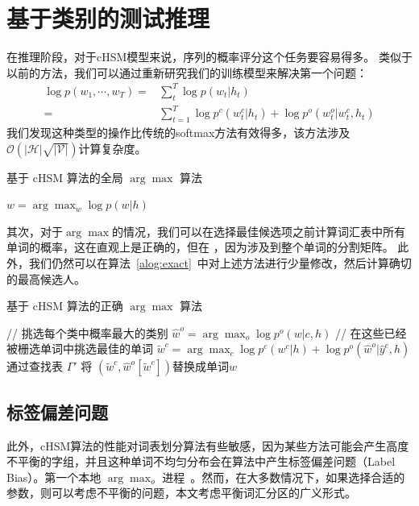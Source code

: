 \section{基于类别的测试推理}
在推理阶段，对于cHSM模型来说，序列的概率评分这个任务要容易得多。
类似于以前的方法，我们可以通过重新研究我们的训练模型来解决第一个问题：
\begin{equation}\label{equ:class_inf}
\begin{split}
\log p(w_1,\cdots, w_T)=&\sum_t^T\log p(w_t|h_t) \\
=&\sum_{t=1}^{T}\log p^c(w^c_t|h_t) +\log p^o(w^o_t|w^c_t,h_t)
\end{split}
\end{equation}
我们发现这种类型的操作比传统的softmax方法有效得多，该方法涉及$ \mathcal{O(|H|\sqrt{|\mathcal{V}|})}$计算复杂度。

\begin{algorithm}[!ht]
\caption{基于 cHSM 算法的全局 $\arg\max$ 算法}\label{alog:alls}
 {$w=\arg\max_w \log p(w|h)$}\;
\end{algorithm}

其次，对于$\arg\max $的情况，我们可以在选择最佳候选项之前计算词汇表中所有单词的概率，这在直观上是正确的，但在
，因为涉及到整个单词的分割矩阵。 此外，我们仍然可以在算法~\ref{alog:exact}~中对上述方法进行少量修改，然后计算确切的最高候选人。
\begin{algorithm}[!ht]
\caption{基于 cHSM 算法的正确 $\arg\max$ 算法}\label{alog:exact}
{// 挑选每个类中概率最大的类别}\;
 {$\hat w^o=\arg\max_o{\log p^o(w| c,h)}$ }\;
 {// 在这些已经被栅选单词中挑选最佳的单词}
 {$\tilde w^c=\arg\max_c{\log p^c(w^c|h)+\log p^o(\hat w^o|\hat y^c,h)}$}\;
通过查找表 $\Gamma'$ 将 $(\tilde w^c,\hat w^o[\tilde w^c])$替换成单词$w$ \;
\end{algorithm}

\subsection{标签偏差问题}
此外，cHSM算法的性能对词表划分算法有些敏感，因为某些方法可能会产生高度不平衡的字组，并且这种单词不均匀分布会在算法中产生标签偏差问题（Label Bias）。第一个本地 $\arg\max_o$ 进程~。然而，在大多数情况下，如果选择合适的参数，则可以考虑不平衡的问题，本文考虑平衡词汇分区的广义形式。

